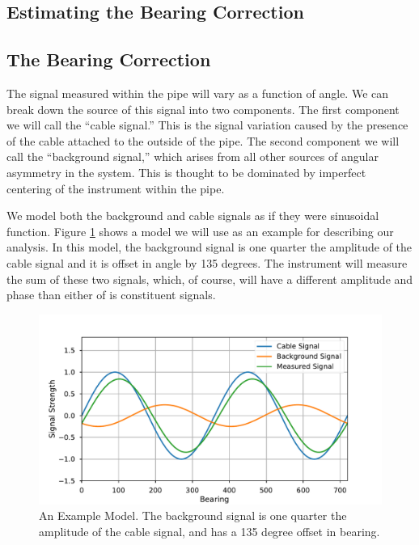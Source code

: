 \documentclass[paper=a4, fontsize=11pt]{scrartcl}
\numberwithin{equation}{section}		%
\numberwithin{figure}{section}			%
\numberwithin{table}{section}				%
\begin{document}
\begin{appendices}
\section{Estimating the Bearing Correction}
\subsection{The Bearing Correction}
The signal measured within the pipe will vary as a function of angle.  We can break down the source of this signal into two components.  The first component we will call the ``cable signal.''  This is the signal variation caused by the presence of the cable attached to the outside of the pipe.  The second component we will call the ``background signal,'' which arises from all other sources of angular asymmetry in the system.  This is thought to be dominated by imperfect centering of the instrument within the pipe.

\par We model both the background and cable signals as if they were sinusoidal function.  Figure \ref{fig:sigs_vs_bearing} shows a model we will use as an example for describing our analysis.  In this model, the background signal is one quarter the amplitude of the cable signal and it is offset in angle by 135 degrees.  The instrument will measure the sum of these two signals, which, of course, will have a different amplitude and phase than either of is constituent signals.

\begin{figure}
  \caption{An Example Model.  The background signal is one quarter the amplitude of the cable signal, and has a 135 degree offset in bearing.}
  \label{fig:sigs_vs_bearing}
  \centering
  \includegraphics[width=1.0\textwidth]{figures/sigs_vs_bearing.pdf}
\end{figure}


\end{appendices}
\end{document}
